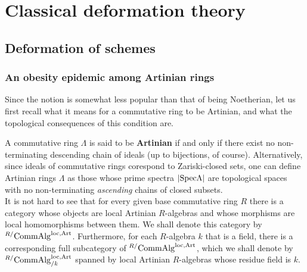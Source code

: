 \section{Classical deformation theory}
    \subsection{Deformation of schemes}
        \subsubsection{An obesity epidemic among Artinian rings}
            Since the notion is somewhat less popular than that of being Noetherian, let us first recall what it means for a commutative ring to be Artinian, and what the topological consequences of this condition are.
            
            \begin{definition} \label{def: artinian_rings} 
                A commutative ring $\Lambda$ is said to be \textbf{Artinian} if and only if there exist no non-terminating descending chain of ideals (up to bijections, of course). Alternatively, since ideals of commutative rings corespond to Zariski-closed sets, one can define Artinian rings $\Lambda$ as those whose prime spectra $|\mathrm{Spec} \Lambda|$ are topological spaces with no non-terminating \textit{ascending} chains of closed subsets. 
                \\
                It is not hard to see that for every given base commutative ring $R$ there is a category whose objects are local Artinian $R$-algebras and whose morphisms are local homomorphisms between them. We shall denote this category by ${}^{R/}\mathrm{Comm}\mathrm{Alg}^{\mathrm{loc}, \mathrm{Art}}$. Furthermore, for each $R$-algebra $k$ that is a field, there is a corresponding full subcategory of ${}^{R/}\mathrm{Comm}\mathrm{Alg}^{\mathrm{loc}, \mathrm{Art}}$, which we shall denote by ${}^{R/}\mathrm{Comm}\mathrm{Alg}_{/k}^{\mathrm{loc}, \mathrm{Art}}$ spanned by local Artinian $R$-algebras whose residue field is $k$. 
            \end{definition}
            
